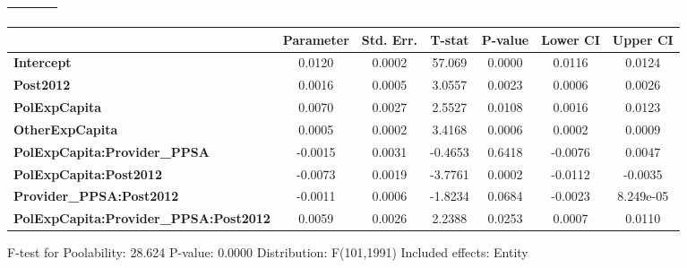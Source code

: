 \begin{center}
\begin{tabular}{lclc}
\textbf{}                                     &                    & \textbf{                     }   &                  \\
\bottomrule
\end{tabular}
\begin{tabular}{lcccccc}
                                              & \textbf{Parameter} & \textbf{Std. Err.} & \textbf{T-stat} & \textbf{P-value} & \textbf{Lower CI} & \textbf{Upper CI}  \\
\midrule
\textbf{Intercept}                            &       0.0120       &       0.0002       &      57.069     &      0.0000      &       0.0116      &       0.0124       \\
\textbf{Post2012}                             &       0.0016       &       0.0005       &      3.0557     &      0.0023      &       0.0006      &       0.0026       \\
\textbf{PolExpCapita}                         &       0.0070       &       0.0027       &      2.5527     &      0.0108      &       0.0016      &       0.0123       \\
\textbf{OtherExpCapita}                       &       0.0005       &       0.0002       &      3.4168     &      0.0006      &       0.0002      &       0.0009       \\
\textbf{PolExpCapita:Provider\_PPSA}          &      -0.0015       &       0.0031       &     -0.4653     &      0.6418      &      -0.0076      &       0.0047       \\
\textbf{PolExpCapita:Post2012}                &      -0.0073       &       0.0019       &     -3.7761     &      0.0002      &      -0.0112      &      -0.0035       \\
\textbf{Provider\_PPSA:Post2012}              &      -0.0011       &       0.0006       &     -1.8234     &      0.0684      &      -0.0023      &     8.249e-05      \\
\textbf{PolExpCapita:Provider\_PPSA:Post2012} &       0.0059       &       0.0026       &      2.2388     &      0.0253      &       0.0007      &       0.0110       \\
\bottomrule
\end{tabular}
\end{center}

F-test for Poolability: 28.624 \newline
 P-value: 0.0000 \newline
 Distribution: F(101,1991) \newline
  \newline
 Included effects: Entity